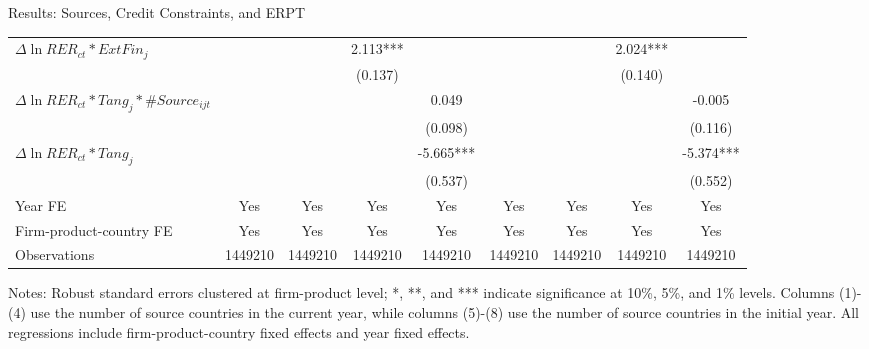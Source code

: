 \documentclass[10pt]{beamer}
\begin{document}
\begin{frame}{Results: Sources, Credit Constraints, and ERPT}
\begin{table}[htbp]
{\begin{threeparttable}
\begin{tabular}{lcccccccc}
			$\Delta \ln RER_{ct}*ExtFin_{j}$ &     &       & 2.113*** &       &       &       & 2.024*** &  \\
			&   &       & (0.137) &       &       &       & (0.140) &  \\
			$\Delta \ln RER_{ct}*Tang_{j}*\#Source_{ijt}$ &    &       &       & 0.049 &       &       &       & -0.005 \\
			&    &       &       & (0.098) &       &       &       & (0.116) \\
			$\Delta \ln RER_{ct}*Tang_{j}$ &   &       &       & -5.665*** &       &       &       & -5.374*** \\
			&  &       &       & (0.537) &       &       &       & (0.552) \\
                \midrule
			Year FE  & Yes   & Yes   & Yes   & Yes & Yes   & Yes   & Yes   & Yes\\
			Firm-product-country FE & Yes   & Yes   & Yes   & Yes & Yes   & Yes   & Yes   & Yes\\
			Observations & 1449210 & 1449210 & 1449210 & 1449210 & 1449210 & 1449210 & 1449210 & 1449210\\
			\bottomrule
		\end{tabular}
		\begin{tablenotes}
			\footnotesize
			\item Notes: Robust standard errors clustered at firm-product level; *, **, and *** indicate significance at 10\%, 5\%, and 1\% levels. Columns (1)-(4) use the number of source countries in the current year, while columns (5)-(8) use the number of source countries in the initial year. All regressions include firm-product-country fixed effects and year fixed effects.
		\end{tablenotes}
	\end{threeparttable}
	}
	\label{tab.source}
    \end{table}
    \hyperlink{tab.source.distance}{}
\end{frame}
\end{document}
